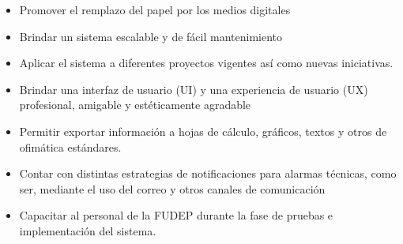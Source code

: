 \begin{itemize}
    \item Promover el remplazo del papel por los medios digitales
    \item Brindar un sistema escalable y de fácil mantenimiento
    \item Aplicar el sistema a diferentes proyectos vigentes así como nuevas iniciativas.
    \item Brindar una interfaz de usuario (UI) y una experiencia de usuario (UX) profesional, amigable y estéticamente agradable
    \item Permitir exportar información a hojas de cálculo, gráficos, textos y otros de ofimática estándares.
    \item Contar con distintas estrategias de notificaciones para alarmas técnicas, como ser, mediante el uso del correo y otros canales de comunicación
    \item Capacitar al personal de la FUDEP durante la fase de pruebas e implementación del sistema.
\end{itemize}